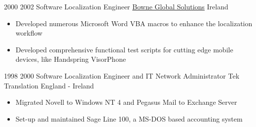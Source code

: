 \vspace{0.25\baselineskip}
\begin{twenty}
\twentyitem
  {2000}
  {2002}
  {Software Localization Engineer}
  {\href{https://www.lionbridge.com/}{Bowne Global Solutions}}
  {Ireland}
  {}
  {}
  {\begin{itemize}
    \item Developed numerous Microsoft Word VBA macros to enhance the localization workflow
    \item Developed comprehensive functional test scripts for cutting edge mobile devices, like Handspring VisorPhone
  \end{itemize}
  }
\end{twenty}

\vspace{0.25\baselineskip}
\begin{twenty}
\twentyitem
  {1998}
  {2000}
  {Software Localization Engineer and IT Network Administrator}
  {Tek Translation}
  {England - Ireland}
  {}
  {}
  {\begin{itemize}
    \item Migrated Novell to Windows NT 4 and Pegasus Mail to Exchange Server
    \item Set-up and maintained Sage Line 100, a MS-DOS based accounting system
  \end{itemize}
  }
\end{twenty}

\vspace{0.25\baselineskip}
